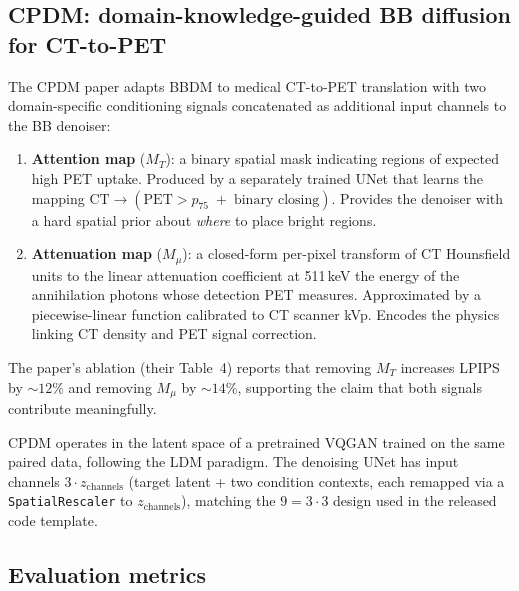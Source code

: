 \documentclass[11pt,a4paper]{article}
\begin{document}
\subsection{CPDM: domain-knowledge-guided BB diffusion for CT-to-PET}
\label{sec:cpdm-theory}

The CPDM paper \parencite{nguyen2025cpdm} adapts BBDM to medical CT-to-PET 
translation with two domain-specific conditioning signals concatenated as 
additional input channels to the BB denoiser:

\begin{enumerate}
  \item \textbf{Attention map} ($M_T$): a binary spatial mask indicating regions 
  of expected high PET uptake. Produced by a separately trained UNet that learns 
  the mapping $\text{CT} \to (\text{PET} > p_{75} \;+\; \text{binary closing})$. 
  Provides the denoiser with a hard spatial prior about \emph{where} to place 
  bright regions.
  \item \textbf{Attenuation map} ($M_\mu$): a closed-form per-pixel transform of 
  CT Hounsfield units to the linear attenuation coefficient at 511\,keV the energy 
  of the annihilation photons whose detection PET measures. Approximated by a 
  piecewise-linear function calibrated to CT scanner kVp. Encodes the physics 
  linking CT density and PET signal correction.
\end{enumerate}

The paper's ablation (their Table~4) reports that removing $M_T$ increases LPIPS 
by $\sim 12\%$ and removing $M_\mu$ by $\sim 14\%$, supporting the claim that 
both signals contribute meaningfully.

CPDM operates in the latent space of a pretrained VQGAN trained on the same 
paired data, following the LDM paradigm. The denoising UNet has input 
channels $3 \cdot z_{\text{channels}}$ (target latent + two condition 
contexts, each remapped via a \texttt{SpatialRescaler} to $z_{\text{channels}}$), 
matching the $9 = 3 \cdot 3$ design used in the released code template.

\subsection{Evaluation metrics}
\label{sec:eval-metrics}
\end{document}
